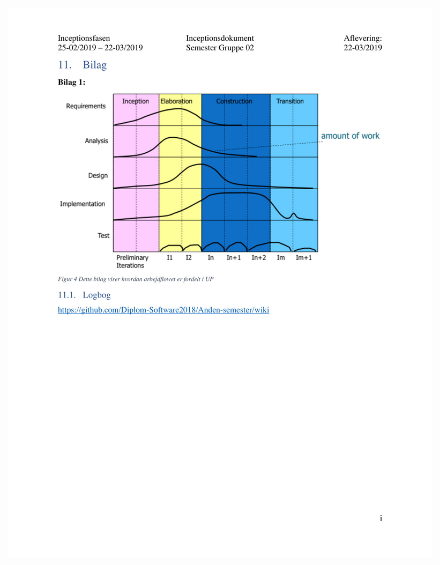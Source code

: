 \begin{figure}[hb]
  \includegraphics[scale = 0.33]{./PNG/Inceptions/Gruppe 02 + InceptionsDokument-34.jpg} 
\end{figure}

